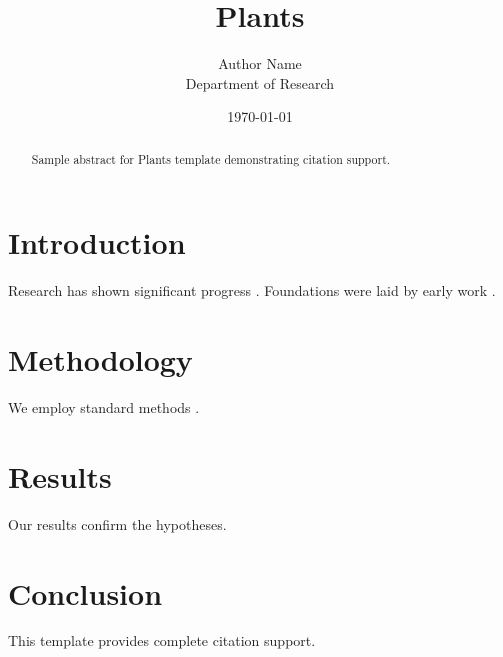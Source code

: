 \documentclass{mdpi}
\title{Plants}
\author{Author Name \\ \small Department of Research}
\date{\today}
\begin{document}
\maketitle

\begin{abstract}
Sample abstract for Plants template demonstrating citation support.
\end{abstract}

\section{Introduction}
Research has shown significant progress \citep{einstein1905}. Foundations were laid by early work \citep{turing1950}.

\section{Methodology}
We employ standard methods \citep{knuth1984}.

\section{Results}
Our results confirm the hypotheses.

\section{Conclusion}
This template provides complete citation support.



\end{document}
